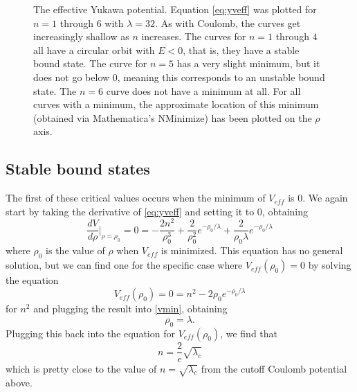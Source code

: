 \documentclass[12pt,twoside]{reedthesis}
\begin{document}
\begin{figure}[h]
\caption[The effective Yukawa potential]{The effective Yukawa potential. Equation \eqref{eq:yveff} was plotted for $n = 1$ through $6$ with $\lambda = 32$. As with Coulomb, the curves get increasingly shallow as $n$ increases. The curves for $n = 1$ through $4$ all have a circular orbit with $E < 0$, that is, they have a stable bound state. The curve for $n = 5$ has a very slight minimum, but it does not go below $0$, meaning this corresponds to an unstable bound state. The $n = 6$ curve does not have a minimum at all. For all curves with a minimum, the approximate location of this minimum (obtained via Mathematica's NMinimize) has been plotted on the $\rho$ axis.}
\label{fig:yveff}
\end{figure}

\subsection{Stable bound states}
The first of these critical values occurs when the minimum of $V_{eff}$ is 0. We again start by taking the derivative of \eqref{eq:yveff} and setting it to 0, obtaining
\begin{equation}
\frac{dV}{d\rho}\Big |_{\rho = \rho_0} =0 = -\frac{2n^2}{\rho_0^3} + \frac{2}{\rho_0^2}e^{-\rho_0/\lambda} + \frac{2}{\rho_0 \lambda} e^{-\rho_0/\lambda}
\label{vmin}
\end{equation}
where $\rho_0$ is the value of $\rho$ when $V_{eff}$ is minimized. This equation has no general solution, but we can find one for the specific case where $V_{eff}(\rho_0) = 0$ by solving the equation
\begin{equation}
V_{eff}(\rho_0)=0 = n^2 - 2\rho_0 e^{-\rho_0/\lambda} 
\end{equation}
for $n^2$
and plugging the result into \eqref{vmin}, obtaining
\begin{equation}
\rho_0 = \lambda \mbox{.}
\end{equation}
Plugging this back into the equation for $V_{eff}(\rho_0)$, we find that
\begin{equation}
n = {\frac{2}{e}}\sqrt{\lambda_c} 
\label{eq:stable}
\end{equation}
which is pretty close to the value of $n = \sqrt{\lambda_c}$ from the cutoff Coulomb potential above. 
\end{document}
